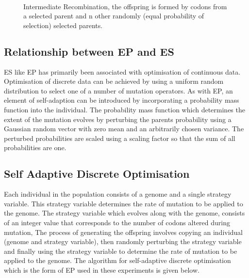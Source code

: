 \begin{figure}[]
\centerline{\hbox{
}}
\caption[Intermediate Recombination]{Intermediate Recombination, the offspring is formed by codons from a selected parent and n other randomly (equal probability of selection) selected parents.}
\label{intermediate_recombination}
\end{figure}

\subsection{Relationship between EP and ES}

ES like EP has primarily been associated with optimisation of continuous data. Optimisation of discrete data can be achieved by using a uniform random distribution to select one of a number of mutation operators. As with EP, an element of self-adaption can be introduced by incorporating a probability mass function into the individual. The probability mass function which determines the extent of the mutation  evolves by perturbing the parents probability using a Gaussian random vector with zero mean and an arbitrarily chosen variance. The perturbed probabilities are scaled using a scaling factor so that the sum of all probabilities are one. 

\subsection{Self Adaptive Discrete Optimisation}
Each individual in the population consists of a genome and a single strategy variable. This strategy variable determines the rate of mutation to be applied to the genome. The strategy variable which  evolves along with the genome, consists of an integer value that corresponds to the number of codons altered during mutation,
The process of generating the offspring involves copying an individual (genome and strategy variable), then randomly perturbing the strategy variable and finally using the strategy variable to determine the rate of mutation to be applied to the genome. The algorithm for self-adaptive discrete optimisation which is the form of EP used in these experiments is given below.



